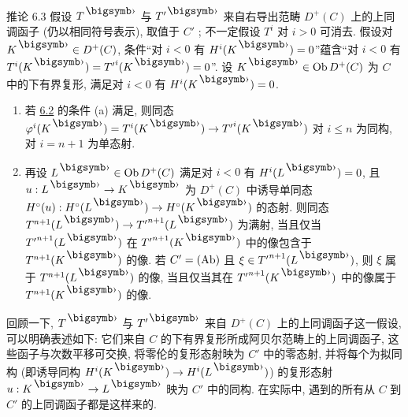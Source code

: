 \begin{enonce*}{推论 6.3}
假设 $T^{\bigdot}$ 与 $T'^{\bigdot}$ 来自右导出范畴 $D^{+}(C)$ 上的上同调函子 (仍以相同符号表示), 取值于 $C'$ \cite{sga4.exp.XII.bib.3}; 不一定假设 $T^{i}$ 对 $i>0$ 可消去. 假设对 $K^{\bigdot}\in D^{+}(C)$, 条件“对 $i<0$ 有 $H^{i}(K^{\bigdot})=0$”蕴含“对 $i<0$ 有 $T^{i}(K^{\bigdot})={T'}^{i}(K^{\bigdot})=0$”. 设 $K^{\bigdot}\in\Ob D^{+}(C)$ 为 $C$ 中的下有界复形, 满足对 $i<0$ 有 $H^{i}(K^{\bigdot})=0$.
\begin{enumerate}
\renewcommand{\theenumi}{\roman{enumi}}
\renewcommand{\labelenumi}{(\theenumi)}
\item 若 \hyperref[XII.lem6.2]{6.2} 的条件 {\rm (a)} 满足, 则同态 $\varphi^{i}(K^{\bigdot})=T^{i}(K^{\bigdot})\to
  {T'}^{i}(K^{\bigdot})$ 对 $i\leq n$ 为同构, 对 $i=n+1$ 为单态射.

\item 再设 $L^{\bigdot}\in\Ob D^{+}(C)$ 满足对 $i<0$ 有 $H^{i}(L^{\bigdot})=0$, 且 $u:L^{\bigdot}\to K^{\bigdot}$ 为 $D^{+}(C)$ 中诱导单同态 $H^{\circ}(u):H^{\circ}(L^{\bigdot})\to
  H^{\circ}(K^{\bigdot})$ 的态射. 则同态 $T^{n+1}(L^{\bigdot})\to {T'}^{n+1}(L^{\bigdot})$ 为满射\pageoriginale, 当且仅当 ${T'}^{n+1}(L^{\bigdot})$ 在 ${T'}^{n+1}(K^{\bigdot})$ 中的像包含于 $T^{n+1}(K^{\bigdot})$ 的像. 若 $C'=(\operatorname{Ab})$ 且 $\xi\in {T'}^{n+1}(L^{\bigdot})$, 则 $\xi$ 属于 $T^{n+1}(L^{\bigdot})$ 的像, 当且仅当其在 ${T'}^{n+1}(K^{\bigdot})$ 中的像属于 $T^{n+1}(K^{\bigdot})$ 的像.
\end{enumerate}
\end{enonce*}

回顾一下, $T^{\bigdot}$ 与 $T'^{\bigdot}$ 来自 $D^{+}(C)$ 上的上同调函子这一假设, 可以明确表述如下: 它们来自 $C$ 的下有界复形所成阿贝尔范畴上的上同调函子, 这些函子与次数平移可交换, 将零伦的复形态射映为 $C'$ 中的零态射, 并将每个为拟同构 (即诱导同构 $H^{i}(K^{\bigdot})\to H^{i}(L^{\bigdot})$) 的复形态射 $u:K^{\bigdot}\to L^{\bigdot}$ 映为 $C'$ 中的同构. 在实际中, 遇到的所有从 $C$ 到 $C'$ 的上同调函子都是这样来的.

